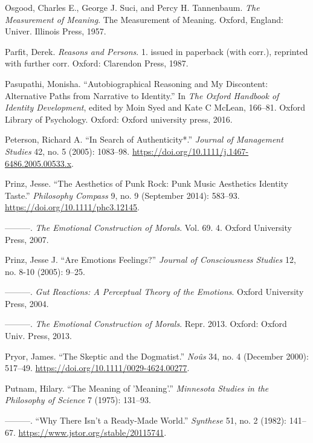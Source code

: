 \documentclass[phdthesis,12pt,final]{wuthesis}
\newlength{\cslhangindent}
\newenvironment{CSLReferences}[2] %
{\begin{list}{}{%
	\setlength{\itemindent}{0pt}
	\setlength{\leftmargin}{0pt}
	\setlength{\parsep}{0pt}
	\ifodd #1
	\setlength{\leftmargin}{\cslhangindent}
	\setlength{\itemindent}{-1\cslhangindent}
	\fi
	\setlength{\itemsep}{#2\baselineskip}}}
{\end{list}}
\theoremstyle{definition}
\theoremstyle{definition}
\theoremstyle{definition}
\theoremstyle{definition}
\theoremstyle{remark}
\begin{document}
\begin{CSLReferences}{1}{0}
Osgood, Charles E., George J. Suci, and Percy H. Tannenbaum. \emph{The Measurement of Meaning}. The Measurement of Meaning. Oxford, England: Univer. Illinois Press, 1957.

Parfit, Derek. \emph{Reasons and Persons}. 1. issued in paperback (with corr.), reprinted with further corr. Oxford: Clarendon Press, 1987.

Pasupathi, Monisha. {``Autobiographical {Reasoning} and {My} {Discontent}: {Alternative Paths} from {Narrative} to {Identity}.''} In \emph{The {Oxford} Handbook of Identity Development}, edited by Moin Syed and Kate C McLean, 166--81. Oxford Library of Psychology. Oxford: Oxford university press, 2016.

Peterson, Richard A. {``In {Search} of {Authenticity}*.''} \emph{Journal of Management Studies} 42, no. 5 (2005): 1083--98. \url{https://doi.org/10.1111/j.1467-6486.2005.00533.x}.

Prinz, Jesse. {``The {Aesthetics} of {Punk Rock}: {Punk Music Aesthetics Identity Taste}.''} \emph{Philosophy Compass} 9, no. 9 (September 2014): 583--93. \url{https://doi.org/10.1111/phc3.12145}.

---------. \emph{The {Emotional Construction} of {Morals}}. Vol. 69. 4. Oxford University Press, 2007.

Prinz, Jesse J. {``Are Emotions Feelings?''} \emph{Journal of Consciousness Studies} 12, no. 8-10 (2005): 9--25.

---------. \emph{Gut {Reactions}: {A Perceptual Theory} of the {Emotions}}. Oxford University Press, 2004.

---------. \emph{The {Emotional Construction} of {Morals}}. Repr. 2013. Oxford: Oxford Univ. Press, 2013.

Pryor, James. {``The {Skeptic} and the {Dogmatist}.''} \emph{Noûs} 34, no. 4 (December 2000): 517--49. \url{https://doi.org/10.1111/0029-4624.00277}.

Putnam, Hilary. {``The {Meaning} of '{Meaning}'.''} \emph{Minnesota Studies in the Philosophy of Science} 7 (1975): 131--93.

---------. {``Why {There Isn}'t a {Ready-Made World}.''} \emph{Synthese} 51, no. 2 (1982): 141--67. \url{https://www.jstor.org/stable/20115741}.


\end{CSLReferences}
\end{document}
